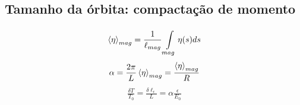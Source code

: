 \subsection{Tamanho da órbita: compactação de momento}\label{sec:3.2}
\begin{align}
	\left< \eta \right>_{mag} = \frac{1}{\ell_{mag}}\int\limits_{mag}^{}\eta(s)ds\label{eq:3.13}
\end{align}
\begin{align}
	\alpha = \frac{2\pi}{L}\left< \eta \right>_{mag} = \frac{\left< \eta \right>_{mag}}{R}\label{eq:3.14}
\end{align}
\begin{align}
	\frac{\delta T}{T_0} = \frac{\delta \ell_\epsilon}{L} = \alpha \frac{\epsilon}{E_0}\label{eq:3.15}
\end{align}